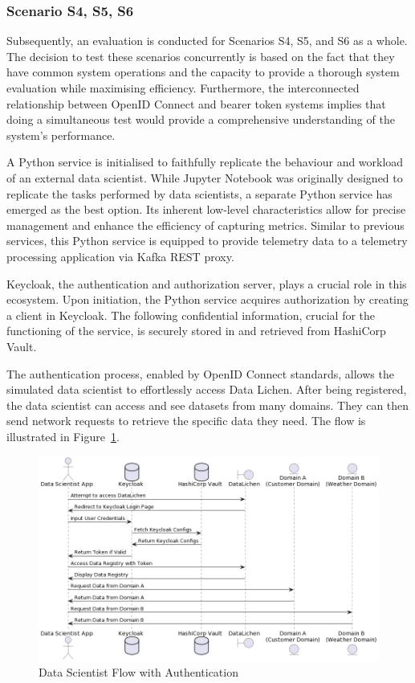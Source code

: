 \documentclass[preprint,12pt]{elsarticle}
\begin{document}
\subsubsection{Scenario S4, S5, S6}

Subsequently, an evaluation is conducted for Scenarios S4, S5, and S6 as a whole. The decision to test these scenarios concurrently is based on the fact that they have common system operations and the capacity to provide a thorough system evaluation while maximising efficiency. Furthermore, the interconnected relationship between OpenID Connect and bearer token systems implies that doing a simultaneous test would provide a comprehensive understanding of the system's performance.

A Python service is initialised to faithfully replicate the behaviour and workload of an external data scientist. While Jupyter Notebook was originally designed to replicate the tasks performed by data scientists, a separate Python service has emerged as the best option. Its inherent low-level characteristics allow for precise management and enhance the efficiency of capturing metrics. Similar to previous services, this Python service is equipped to provide telemetry data to a telemetry processing application via Kafka REST proxy. 

Keycloak, the authentication and authorization server, plays a crucial role in this ecosystem. Upon initiation, the Python service acquires authorization by creating a client in Keycloak. The following confidential information, crucial for the functioning of the service, is securely stored in and retrieved from HashiCorp Vault. 

The authentication process, enabled by OpenID Connect standards, allows the simulated data scientist to effortlessly access Data Lichen. After being registered, the data scientist can access and see datasets from many domains. They can then send network requests to retrieve the specific data they need. The flow is illustrated in Figure~\ref{dataScientistFlowWithAuthentication}.


\begin{figure}[h]
  \centering
  \includegraphics[width=\textwidth]{images/data-scientist-data-lichen-flow-with-authentication.jpg}
  \caption{Data Scientist Flow with Authentication}
  \label{dataScientistFlowWithAuthentication}
\end{figure}
\end{document}
